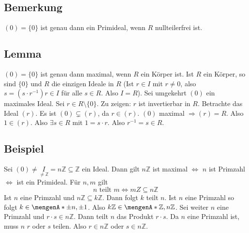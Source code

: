 \subsection[Bemerkung, wann $(0)$ ein Primideal ist]{Bemerkung} %
\label{sub:612}
$(0)= \{0\}$ ist genau dann ein Primideal, wenn $R$ nullteilerfrei ist.

\subsection[Lemma: $(0)$ ist in Körpern maximal]{Lemma} %
\label{sub:613}
$(0)= \{0\}$ ist genau dann maximal, wenn $R$ ein Körper ist.
Ist $R$ ein Körper, so sind $\{0\}$ und $R$ die einzigen Ideale in $R$ (Ist $r \in I$ mit $r \not=0$, also $s= (s \cdot r ^{-1})r \in I$ für alle $s \in R$. Also $I=R$).
Sei umgekehrt $(0)$ ein maximales Ideal. Sei $r \in R \setminus \{0\}$. Zu zeigen: $r$ ist invertierbar in $R$. Betrachte das Ideal $(r)$. Es ist $(0) \subsetneq (r)$, da
$r \in (r)$. $(0)$ maximal $\Rightarrow (r) =R$. Also $1 \in (r)$. Also $\exists s \in R$ mit $1= s \cdot r$. Also $r ^{-1} = s \in R$. \bewende

\subsection[Beispiel: Maximale und Primideale in $\mathds{Z}$]{Beispiel} %
\label{sub:614}
Sei $(0) \not= \underset{\not= \mathds{Z}}{I} = n \mathds{Z} \subseteq \mathds{Z}$ ein Ideal. Dann gilt $n \mathds{Z}$ ist maximal $\iff$ $n$ ist Primzahl $\iff$ ist ein 
Primideal.
Für $n, m$ gilt
\[
	n  \text{ teilt } m \iff m Z \subseteq n \mathds{Z}
\]
Ist $n$ eine Primzahl und $n \mathds{Z} \subseteq k \mathds{Z}$. Dann folgt $k$ teilt $n$. Ist $n$ eine Primzahl so folgt $k \in \set{\pm n, \pm 1} $. Also 
$k \mathds{Z} \in \set{\mathds{Z}, n \mathds{Z}} $. Sei weiter $n$ eine Primzahl und $r \cdot s \in n \mathds{Z}$. Dann teilt $n$ das Produkt $r \cdot s$. Da $n$ eine 
Primzahl ist, muss $n$ $r$ oder $s$ teilen. Also $r\in n \mathds{Z}$ oder $s \in n \mathds{Z}$.\bewende

